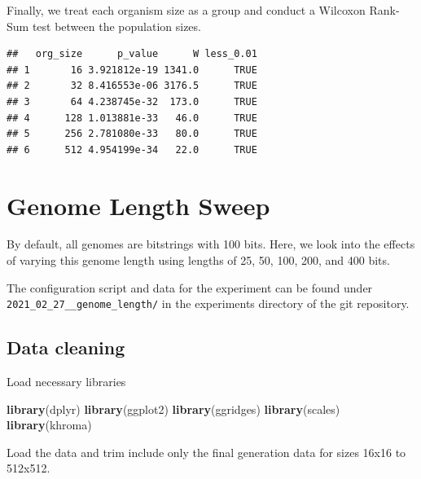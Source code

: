 \documentclass[]{book}
\newenvironment{Shaded}{\begin{snugshade}}{\end{snugshade}}
\newcommand{\KeywordTok}[1]{\textcolor[rgb]{0.13,0.29,0.53}{\textbf{#1}}}
\newcommand{\NormalTok}[1]{#1}
\begin{document}
Finally, we treat each organism size as a group and conduct a Wilcoxon Rank-Sum test between the population sizes.

\begin{verbatim}
##   org_size      p_value      W less_0.01
## 1       16 3.921812e-19 1341.0      TRUE
## 2       32 8.416553e-06 3176.5      TRUE
## 3       64 4.238745e-32  173.0      TRUE
## 4      128 1.013881e-33   46.0      TRUE
## 5      256 2.781080e-33   80.0      TRUE
## 6      512 4.954199e-34   22.0      TRUE
\end{verbatim}

\hypertarget{genome-length-sweep}{%
\chapter{Genome Length Sweep}\label{genome-length-sweep}}

By default, all genomes are bitstrings with 100 bits.
Here, we look into the effects of varying this genome length using lengths of 25, 50, 100, 200, and 400 bits.

The configuration script and data for the experiment can be found under \texttt{2021\_02\_27\_\_genome\_length/} in the experiments directory of the git repository.

\hypertarget{data-cleaning-4}{%
\section{Data cleaning}\label{data-cleaning-4}}

Load necessary libraries

\begin{Shaded}
\begin{Highlighting}[]
\KeywordTok{library}\NormalTok{(dplyr)}
\KeywordTok{library}\NormalTok{(ggplot2)}
\KeywordTok{library}\NormalTok{(ggridges)}
\KeywordTok{library}\NormalTok{(scales)}
\KeywordTok{library}\NormalTok{(khroma)}
\end{Highlighting}
\end{Shaded}

Load the data and trim include only the final generation data for sizes 16x16 to 512x512.
\end{document}
